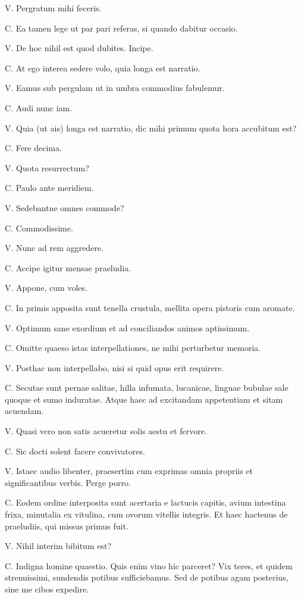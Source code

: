 \documentclass{article}
\begin{document}
V. Pergratum mihi feceris.

C. Ea tamen lege ut par pari referas, si quando dabitur occasio.

V. De hoc nihil est quod dubites. Incipe.

C. At ego interea sedere volo, quia longa est narratio.

V. Eamus sub pergulam ut in umbra commodius fabulemur.

C. Audi nunc iam.

V. Quia (ut ais) longa est narratio, dic mihi primum quota hora accubitum est?

C. Fere decima.

V. Quota resurrectum?

C. Paulo ante meridiem.

V. Sedebantne omnes commode?

C. Commodissime.

V. Nunc ad rem aggredere.

C. Accipe igitur mensae praeludia.

V. Appone, cum voles.

C. In primis apposita sunt tenella crustula, mellita opera pistoris cum aromate.

V. Optimum sane exordium et ad conciliandos animos aptissimum.

C. Omitte quaeso istas interpellationes, ne mihi perturbetur memoria.

V. Posthac non interpellabo, nisi si quid opus erit requirere.

C. Secutae sunt pernae salitae, hilla infumata, lucanicae, linguae bubulae sale quoque et sumo induratae. Atque haec ad excitandam appetentiam et sitam acuendam.

V. Quasi vero non satis acueretur solis aestu et fervore.

C. Sic docti solent facere convivatores.

V. Istaec audio libenter, praesertim cum exprimas omnia propriis et significantibus verbis. Perge porro.

C. Eodem ordine interposita sunt acertaria e lactucis capitis, avium intestina frixa, minutalia ex vitulina, cum ovorum vitellis integris. Et haec hactenus de praeludiis, qui missus primus fuit.

V. Nihil interim bibitum est?

C. Indigna homine quaestio. Quis enim vino hic parceret? Vix teres, et quidem strenuissimi, sundendis potibus sufficiebamus. Sed de potibus agam posterius, sine me cibos expedire.
\end{document}
